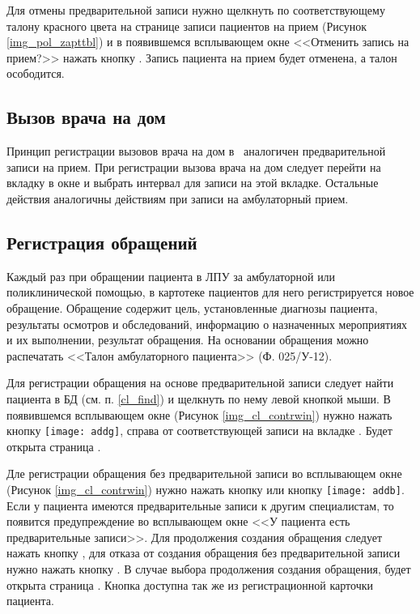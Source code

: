 Для отмены предварительной записи нужно щелкнуть по соответствующему талону красного цвета на странице записи пациентов на прием (Рисунок \ref{img_pol_zapttbl}) и в появившемся всплывающем окне <<Отменить запись на прием?>> нажать кнопку . Запись пациента на прием будет отменена, а талон осободится.

\subsection{Вызов врача на дом} \label{pol_home}

Принцип регистрации вызовов врача на дом в \tmis~аналогичен предварительной записи на прием. При регистрации вызова врача на дом следует перейти на вкладку  в окне  и выбрать интервал для записи на этой вкладке. Остальные действия аналогичны действиям при записи на амбулаторный прием.

\subsection {Регистрация обращений} \label{pol_obr}

Каждый раз при обращении пациента в ЛПУ за амбулаторной или поликлинической помощью, в картотеке пациентов для него регистрируется новое обращение. Обращение содержит цель, установленные диагнозы пациента, результаты осмотров и обследований, информацию о назначенных мероприятиях и их выполнении, результат обращения. На основании обращения можно распечатать <<Талон амбулаторного пациента>> (Ф. 025\slash У-12).

Для регистрации обращения на основе предварительной записи следует найти пациента в БД (см. п. \ref{cl_find}) и щелкнуть по нему левой кнопкой мыши. В появившемся всплывающем окне (Рисунок \ref{img_cl_contrwin}) нужно нажать кнопку \texttt{[image: addg]}, справа от соответствующей записи на вкладке . Будет открыта страница .

Дле регистрации обращения без предварительной записи во всплывающем окне (Рисунок \ref{img_cl_contrwin}) нужно нажать кнопку  или кнопку \texttt{[image: addb]}. Если у пациента имеются предварительные записи к другим специалистам, то появится предупреждение во всплывающем окне <<У пациента есть предварительные записи>>. Для продолжения создания обращения следует нажать кнопку , для отказа от создания обращения без предварительной записи нужно нажать кнопку . В случае выбора продолжения создания обращения, будет открыта страница . Кнопка  доступна так же из регистрационной карточки пациента.

